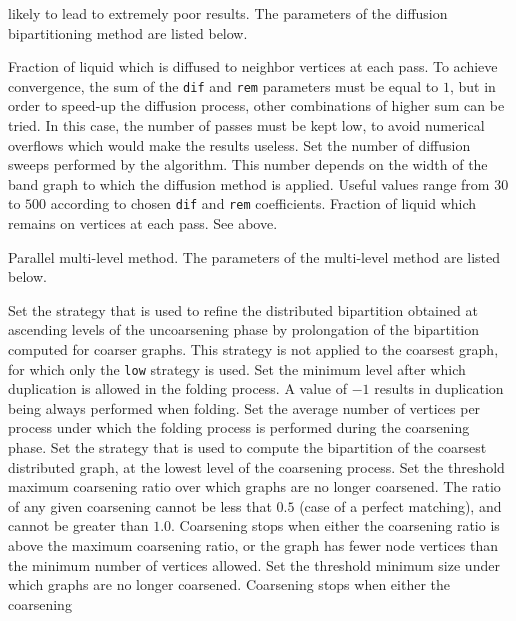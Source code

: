 \begin{itemize}
\begin{itemize}
likely to lead to extremely poor results.  The parameters of the
diffusion bipartitioning method are listed below.
\begin{itemize}
\iteme[{\tt dif=}{\it rat}]
Fraction of liquid which is diffused to neighbor vertices at each
pass. To achieve convergence, the sum of the {\tt dif} and {\tt rem}
parameters must be equal to $1$, but in order to speed-up the diffusion
process, other combinations of higher sum can be tried. In this case,
the number of passes must be kept low, to avoid numerical overflows
which would make the results useless.
\iteme[{\tt pass=}{\it nbr}]
Set the number of diffusion sweeps performed by the algorithm. This
number depends on the width of the band graph to which the diffusion
method is applied. Useful values range from $30$ to $500$ according
to chosen {\tt dif} and {\tt rem} coefficients.
\iteme[{\tt rem=}{\it rat}]
Fraction of liquid which remains on vertices at each pass. See above.
\end{itemize}
\iteme[{\tt m}]
Parallel multi-level method. The parameters of the multi-level method
are listed below.
\begin{itemize}
\iteme[{\tt asc=}{\it strat}]
Set the strategy that is used to refine the distributed bipartition
obtained at ascending levels of the uncoarsening phase by
prolongation of the bipartition computed for coarser graphs.
This strategy is not applied to the coarsest graph,
for which only the {\tt low} strategy is used.
\iteme[{\tt dlevl=}{\it nbr}]
Set the minimum level after which duplication is allowed in the
folding process. A value of $-1$ results in duplication being always
performed when folding.
\iteme[{\tt dvert=}{\it nbr}]
Set the average number of vertices per process under which
the folding process is performed during the coarsening phase.
\iteme[{\tt low=}{\it strat}]
Set the strategy that is used to compute the bipartition of the
coarsest distributed graph,
at the lowest level of the coarsening process.
\iteme[{\tt rat=}{\it rat}]
Set the threshold maximum coarsening ratio over which graphs
are no longer coarsened. The ratio of any given coarsening cannot be
less that $0.5$ (case of a perfect matching), and cannot be greater
than $1.0$. Coarsening stops when either the coarsening ratio is
above the maximum coarsening ratio, or the graph
has fewer node vertices than the minimum number of vertices allowed.
\iteme[{\tt vert=}{\it nbr}]
Set the threshold minimum size under which graphs
are no longer coarsened. Coarsening stops when either the coarsening

\end{itemize}
\end{itemize}
\end{itemize}
